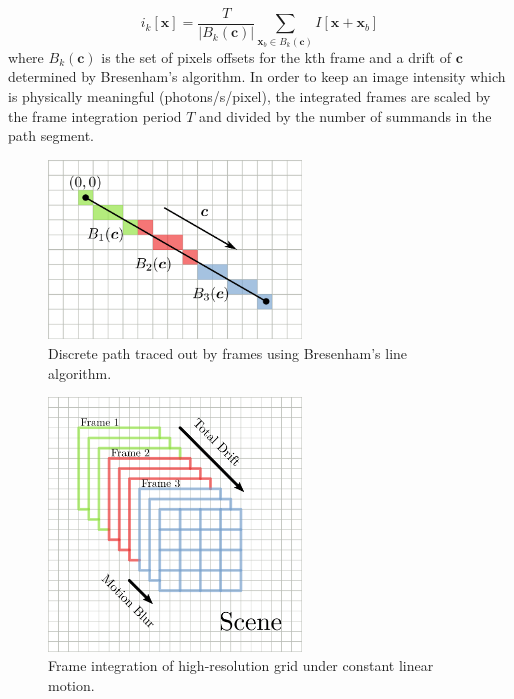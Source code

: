 \documentclass[tocnosub,noragright,centerchapter,12pt]{uiucecethesis09}
\begin{document}
\begin{equation}
  i_k[\bm{x}] = \frac{T}{|B_k(\bm{c})|} \sum_{\bm{x}_b \in B_k(\bm{c})} I[\bm{x} + \bm{x}_b]
\end{equation}
where $B_k(\bm{c})$ is the set of pixels offsets for the kth frame and a drift of $\bm{c}$ determined by Bresenham's algorithm.  In order to keep an image intensity which is physically meaningful (photons/s/pixel), the integrated frames are scaled by the frame integration period $T$ and divided by the number of summands in the path segment.

\begin{figure}
  \centering
  \includegraphics[width=0.6\textwidth]{figures/bresenham.png}
  \caption{Discrete path traced out by frames using Bresenham's line algorithm.}
  \label{fig:bresenham}
\end{figure}

\begin{figure}
  \centering
  \includegraphics[width=0.6\textwidth]{figures/frame_integration.png}
  \caption{Frame integration of high-resolution grid under constant linear motion.}
  \label{fig:frame_subpixel}
\end{figure}
\end{document}
